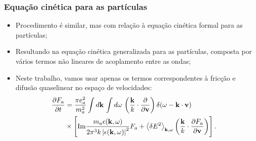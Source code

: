 \documentclass[10pt,aspectratio=1610,lualatex]{beamer}
\begin{document}
\begin{frame}
  \frametitle{Equação cinética para as partículas}
  \begin{itemize}
  \item Procedimento é similar, mas com relação à equação cinética
    formal para as partículas;
    \vspace{0.4cm}
    \pause
    \item Resultando na equação cinética generalizada para as
      partículas, composta por vários termos não lineares de
      acoplamento entre as ondas;
    \vspace{0.4cm}
    \pause
    \item Neste trabalho, vamos usar apenas os termos correspondentes
      à fricção e difusão quaselinear no espaço de velocidades:
    \vspace{0.1cm}  
    \begin{equation*}
      \begin{split}
	\frac{\partial F_a}{\partial t}
	&=\frac{\pi e_a^2}{m_a^2}\int d{\bf k}\,\int d\omega\,
	\left( \frac{\bf k}{k}\cdot \frac{\partial}{\partial {\bf v}}
	\right)\delta(\omega -{\bf k \cdot v})\\
	&\times\left[\mbox{Im} \frac{m_a \epsilon({\bf k},\omega)}
	  {2\pi^3k \left|\epsilon ({\bf k},\omega) \right|^2 }F_a
	  +\left<\delta E^2\right>_{{\bf k},\omega}\left(\frac{\bf k}{k}
	   \cdot \frac{\partial F_a}{\partial \bf v}\right)\right].
      \end{split}
    \end{equation*}
  \end{itemize}
\end{frame}
\end{document}

